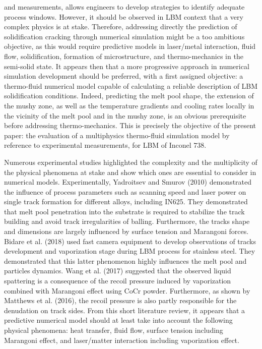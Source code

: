 \documentclass[10pt]{article}
\begin{document}
and measurements, allows engineers to develop strategies to identify adequate process windows. However, it should be observed in LBM context that a very complex physics is at stake. Therefore, addressing directly the prediction of solidification cracking through numerical simulation might be a too ambitious objective, as this would require predictive models in laser/metal interaction, fluid flow, solidification, formation of microstructure, and thermo-mechanics in the semi-solid state. It appears then that a more progressive approach in numerical simulation development should be preferred, with a first assigned objective: a thermo-fluid numerical model capable of calculating a reliable description of LBM solidification conditions. Indeed, predicting the melt pool shape, the extension of the mushy zone, as well as the temperature gradients and cooling rates locally in the vicinity of the melt pool and in the mushy zone, is an obvious prerequisite before addressing thermo-mechanics. This is precisely the objective of the present paper: the evaluation of a multiphysics thermo-fluid simulation model by reference to experimental measurements, for LBM of Inconel 738.

Numerous experimental studies highlighted the complexity and the multiplicity of the physical phenomena at stake and show which ones are essential to consider in numerical models. Experimentally, Yadroitsev and Smurov (2010) demonstrated the influence of process parameters such as scanning speed and laser power on single track formation for different alloys, including IN625. They demonstrated that melt pool penetration into the substrate is required to stabilize the track building and avoid track irregularities of balling. Furthermore, the tracks shape and dimensions are largely influenced by surface tension and Marangoni forces. Bidare et al. (2018) used fast camera equipment to develop observations of tracks development and vaporization stage during LBM process for stainless steel. They demonstrated that this latter phenomenon highly influences the melt pool and particles dynamics. Wang et al. (2017) suggested that the observed liquid spattering is a consequence of the recoil pressure induced by vaporization combined with Marangoni effect using $\mathrm{CoCr}$ powder. Furthermore, as shown by Matthews et al. (2016), the recoil pressure is also partly responsible for the denudation on track sides. From this short literature review, it appears that a predictive numerical model should at least take into account the following physical phenomena: heat transfer, fluid flow, surface tension including Marangoni effect, and laser/matter interaction including vaporization effect.
\end{document}
